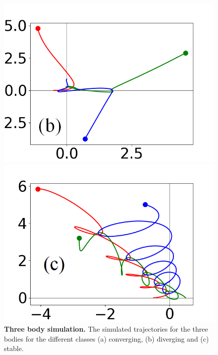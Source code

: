 \documentclass[%
 reprint,
 amsmath,amssymb,
 aps,
]{revtex4-2}
\begin{document}
\begin{enumerate}
\begin{figure}
\begin{minipage}{0.15723\textwidth}
            \end{minipage}
            \hfill
            \begin{minipage}{0.15723\textwidth}
                \centering
                \includegraphics[width=\linewidth]{threebodies_14_marked.png}
            \end{minipage}
            \hfill
            \begin{minipage}{0.15723\textwidth}
                \centering
                \includegraphics[width=\linewidth]{threebodies_13_marked.png}
            \end{minipage}
    
        \caption{\textbf{Three body simulation.} The simulated trajectories for the three bodies for the different classes (a) converging, (b) diverging and (c) stable.}
        \label{fig:classes}    
    \end{figure}
                

\end{enumerate}
\end{document}
